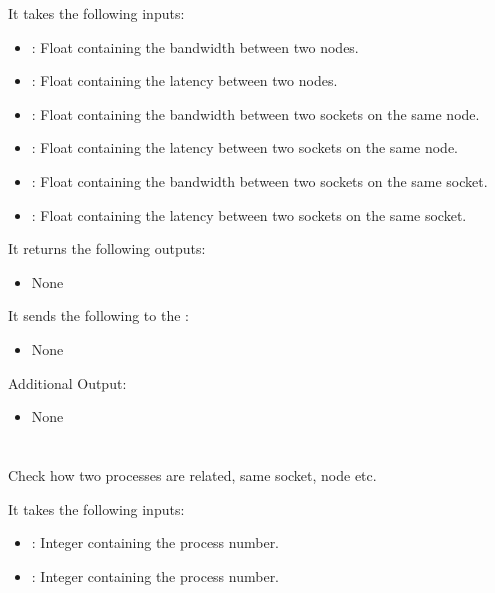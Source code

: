 It takes the following inputs:

\begin{itemize}
\item {}: Float containing the bandwidth between two nodes.
\item {}: Float containing the latency between two nodes.
\item {}: Float containing the bandwidth between two sockets on the same node.
\item {}: Float containing the latency between two sockets on the same node.
\item {}: Float containing the bandwidth between two sockets on the same socket.
\item {}: Float containing the latency between two sockets on the same socket.
\end{itemize}

It returns the following outputs:

\begin{itemize}
\item None
\end{itemize}

It sends the following to the :

\begin{itemize}
\item None
\end{itemize}

Additional Output:
\begin{itemize}
\item None
\end{itemize}

\section{}
Check how two processes are related, same socket, node etc.

It takes the following inputs:

\begin{itemize}
\item {}: Integer containing the process number.
\item {}: Integer containing the process number.
\end{itemize}

